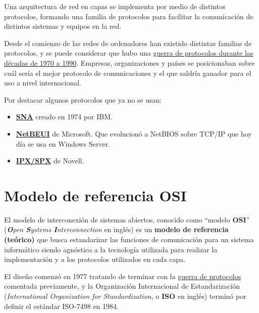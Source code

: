 Una arquitectura de red en capas se implementa por medio de distintos protocolos, formando una familia de protocolos para facilitar la comunicación de distintos sistemas y equipos en la red.


Desde el comienzo de las redes de ordenadores han existido distintas familias de protocolos, y se puede considerar que hubo una \href{https://en.wikipedia.org/wiki/Protocol_Wars}{guerra de protocolos durante las décadas de 1970 a 1990}. Empresas, organizaciones y países se posicionaban sobre cuál sería el mejor protocolo de comunicaciones y el que saldría ganador para el uso a nivel internacional.

Por destacar algunos protocolos que ya no se usan:

\begin{itemize}
    \item \textbf{\href{https://en.wikipedia.org/wiki/Systems_Network_Architecture}{SNA}} creado en 1974 por IBM.
    \item \textbf{\href{https://en.wikipedia.org/wiki/NetBIOS_Frames}{NetBEUI}} de Microsoft. Que evolucionó a NetBIOS sobre TCP/IP que hoy día se usa en Windows Server.
    \item \textbf{\href{https://en.wikipedia.org/wiki/IPX/SPX}{IPX/SPX}} de Novell.
\end{itemize}

\section{Modelo de referencia OSI}
El modelo de interconexión de sistemas abiertos, conocido como “modelo \textbf{OSI}” (\textit{\textbf{O}pen \textbf{S}ystems \textbf{I}nterconnection} en inglés) es un \textbf{modelo de referencia (teórico)} que busca estandarizar las funciones de comunicación para un sistema informático siendo agnóstico a la tecnología utilizada para realizar la implementación y a los protocolos utilizados en cada capa.

El diseño comenzó en 1977 tratando de terminar con la \href{https://en.wikipedia.org/wiki/Protocol_Wars}{guerra de protocolos} comentada previamente, y la Organización Internacional de Estandarización (\textit{International Organization for Standardization}, o \textbf{ISO} en inglés)  terminó por definir el estándar ISO-7498 en 1984.



